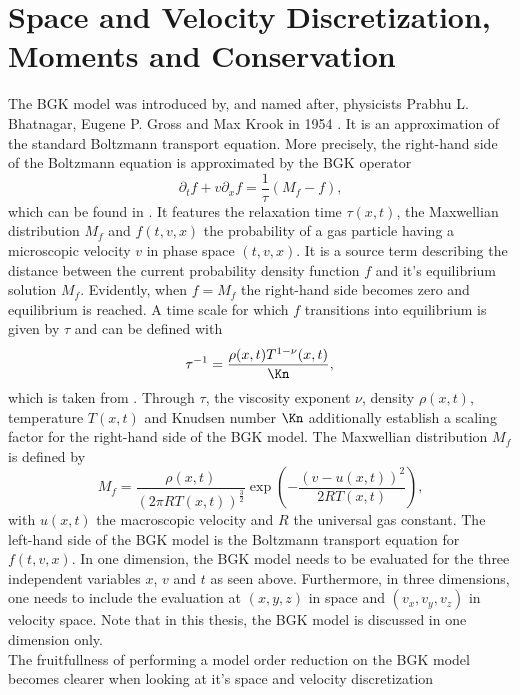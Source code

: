 \section{Space and Velocity Discretization, Moments and Conservation}
The BGK model was introduced by, and named after, physicists Prabhu L. Bhatnagar, Eugene P. Gross and Max Krook in 1954 \cite{BGK}. It is an approximation of the standard Boltzmann transport equation. More precisely, the right-hand side of the Boltzmann equation is approximated by the BGK operator 
\begin{equation}
\partial_t f + v \partial_x f = \frac{1}{\tau} (M_f - f) \text{,}
\label{Eq:BGK}
\end{equation}
which can be found in \cite{puppo2019kinetic}. It features the relaxation time \(\tau(x,t)\), the Maxwellian distribution \(M_f\) and \(f(t,v,x)\) the probability of a gas particle having a microscopic velocity \(v\) in phase space \((t,v,x)\). It is a source term describing the distance between the current probability density function \(f\) and it's equilibrium solution \(M_f\). Evidently, when \(f = M_f\) the right-hand side becomes zero and equilibrium is reached. A time scale for which \(f\) transitions into equilibrium is given by \(\tau\) and can be defined with
\begin{equation}
	\tau^{-1} = \frac{\rho(x,t)T^{1-\nu}(x,t)}{\Kn}\mathrm{,}
\end{equation}
which is taken from \cite{Bernard}. Through \(\tau\), the viscosity exponent \(\nu\), density \(\rho(x,t)\), temperature \(T(x,t)\) and Knudsen number \(\Kn\) additionally establish a scaling factor for the right-hand side of the BGK model. The Maxwellian distribution \(M_f\) is defined by
\begin{equation}
M_f = \frac{\rho(x,t)}{(2\pi R T(x,t))^{\frac{3}{2}}}\exp(-\frac{(v - u(x,t))^2}{2 R T(x,t)}) \text{,}
\end{equation}
with \(u(x,t)\) the macroscopic velocity and \(R\) the universal gas constant.
The left-hand side of the BGK model is the Boltzmann transport equation for \(f(t,v,x)\).
In one dimension, the BGK model needs to be evaluated for the three independent variables \(x\), \(v\) and \(t\) as seen above. Furthermore, in three dimensions, one needs to include the evaluation at \((x,y,z)\) in space and \((v_x,v_y,v_z)\) in velocity space. Note that in this thesis, the BGK model is discussed in one dimension only.\\
The fruitfullness of performing a model order reduction on the BGK model becomes clearer when looking at it's space and velocity discretization
